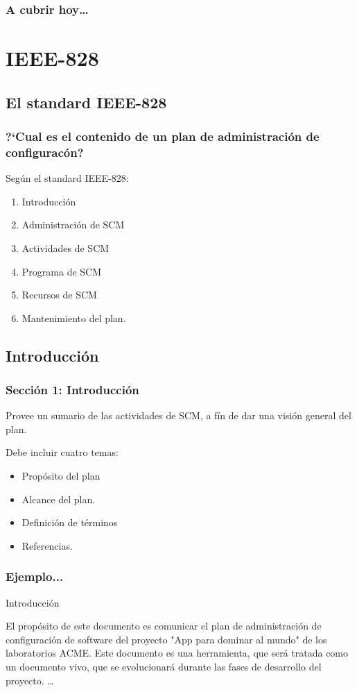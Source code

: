 \theoremstyle{definition}
\newtheorem{definicion}{Definici\'on}

\begin{frame}
\titlepage
\end{frame}

\begin{frame}
\frametitle{A cubrir hoy\ldots}
\tableofcontents
\end{frame}

\section{IEEE-828}
\subsection{El standard IEEE-828}
\begin{frame}
	\frametitle{?`Cual es el contenido de un plan de administraci\'on de configurac\'on?}
	Seg\'un el standard IEEE-828: 
	\begin{enumerate}
		\item Introducci\'on
		\item Administraci\'on de SCM
		\item Actividades de SCM
		\item Programa de SCM
		\item Recursos de SCM
		\item Mantenimiento del plan. 
	\end{enumerate}
\end{frame}
\subsection{Introducci\'on}
\begin{frame}
	\frametitle{Secci\'on 1: Introducci\'on}
	Provee un sumario de las actividades de SCM, a f\'in de dar una 
	visi\'on general del plan. 

	Debe incluir cuatro temas:
	\begin{itemize}
		\item Prop\'osito del plan
		\item Alcance del plan. 
		\item Definici\'on de t\'erminos
		\item Referencias. 
	\end{itemize}
\end{frame}
\begin{frame}
	\frametitle{Ejemplo...}
	Introducci\'on

	El prop\'osito de este documento es comunicar el plan de administraci\'on de configuraci\'on 
	de software del proyecto "App para dominar al mundo" de los laboratorios ACME. 
	Este documento es una herramienta, que ser\'a tratada como un documento vivo, que se 
	evolucionar\'a durante las fases de desarrollo del proyecto. 
\ldots

\end{frame}

